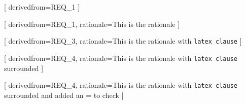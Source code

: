 


[
  derivedfrom=REQ\_1
]

[
  derivedfrom=REQ\_1,
  rationale=This is the rationale
]

[
  derivedfrom=REQ\_3,
  rationale=This is the rationale with \texttt{latex clause}
]

[
  derivedfrom=REQ\_4,
  rationale={This is the rationale with \texttt{latex clause} surrounded}
]

[
  derivedfrom=REQ\_4,
  rationale={This is the rationale with \texttt{latex clause} surrounded and added an = to check}
]
